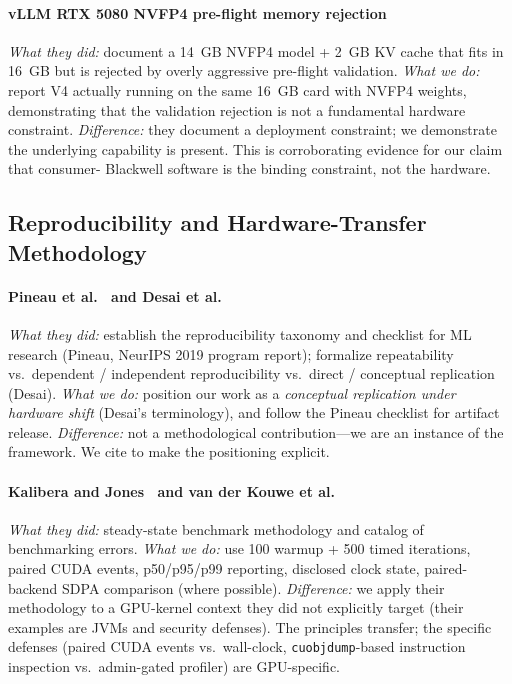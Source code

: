 \documentclass[conference]{IEEEtran}
\begin{document}
\paragraph*{vLLM RTX 5080 NVFP4 pre-flight memory rejection~\cite{vllm2025issue30707}}
\emph{What they did:} document a 14~GB NVFP4 model + 2~GB KV cache
that fits in 16~GB but is rejected by overly aggressive
pre-flight validation. \emph{What we do:} report V4 actually
running on the same 16~GB card with NVFP4 weights, demonstrating
that the validation rejection is not a fundamental hardware
constraint. \emph{Difference:} they document a deployment
constraint; we demonstrate the underlying capability is present.
This is corroborating evidence for our claim that consumer-
Blackwell software is the binding constraint, not the hardware.

\subsection{Reproducibility and Hardware-Transfer Methodology}

\paragraph*{Pineau et al.~\cite{pineau2021reproducibility} and Desai et al.~\cite{desai2025reproducibility}}
\emph{What they did:} establish the reproducibility taxonomy and
checklist for ML research (Pineau, NeurIPS 2019 program report);
formalize repeatability vs.\ dependent / independent reproducibility
vs.\ direct / conceptual replication (Desai). \emph{What we do:}
position our work as a \emph{conceptual replication under hardware
shift} (Desai's terminology), and follow the Pineau checklist for
artifact release. \emph{Difference:} not a methodological
contribution---we are an instance of the framework. We cite to make
the positioning explicit.

\paragraph*{Kalibera and Jones~\cite{kalibera2013rigorous} and van der Kouwe et al.~\cite{vanderkouwe2018benchmarkingcrimes}}
\emph{What they did:} steady-state benchmark methodology and
catalog of benchmarking errors. \emph{What we do:} use 100 warmup
+ 500 timed iterations, paired CUDA events, p50/p95/p99 reporting,
disclosed clock state, paired-backend SDPA comparison (where
possible). \emph{Difference:} we apply their methodology to a
GPU-kernel context they did not explicitly target (their examples
are JVMs and security defenses). The principles transfer; the
specific defenses (paired CUDA events vs.\ wall-clock,
\texttt{cuobjdump}-based instruction inspection vs.\ admin-gated
profiler) are GPU-specific.
\end{document}
